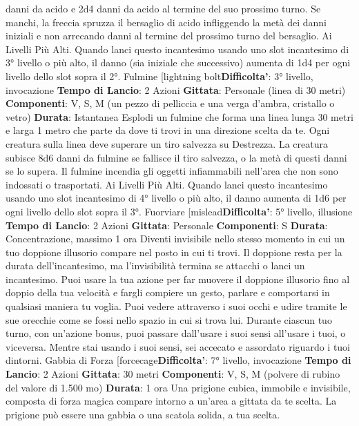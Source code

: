 \begin{multicols}{2}
danni da acido e 2d4 danni da acido al termine del suo
prossimo turno. Se manchi, la freccia spruzza il
bersaglio di acido infliggendo la metà dei danni iniziali e
non arrecando danni al termine del prossimo turno del
bersaglio.
Ai Livelli Più Alti. Quando lanci questo incantesimo
usando uno slot incantesimo di 3° livello o più alto, il
danno (sia iniziale che successivo) aumenta di 1d4 per
ogni livello dello slot sopra il 2°.
Fulmine
[lightning bolt\textbf{Difficolta'}:
3° livello, invocazione
\textbf{Tempo di Lancio}: 2 Azioni
\textbf{Gittata}: Personale (linea di 30 metri)
\textbf{Componenti}: V, S, M (un pezzo di pelliccia e una
verga d’ambra, cristallo o vetro)
\textbf{Durata}: Istantanea
Esplodi un fulmine che forma una linea lunga 30 metri e
larga 1 metro che parte da dove ti trovi in una
direzione scelta da te.
Ogni creatura sulla linea deve superare un tiro salvezza
su Destrezza. La creatura subisce 8d6 danni da fulmine
se fallisce il tiro salvezza, o la metà di questi danni se lo
supera.
Il fulmine incendia gli oggetti infiammabili nell’area che
non sono indossati o trasportati.
Ai Livelli Più Alti. Quando lanci questo incantesimo
usando uno slot incantesimo di 4° livello o più alto, il
danno aumenta di 1d6 per ogni livello dello slot sopra il
3°.
Fuorviare
[mislead\textbf{Difficolta'}:
5° livello, illusione
\textbf{Tempo di Lancio}: 2 Azioni
\textbf{Gittata}: Personale
\textbf{Componenti}: S
\textbf{Durata}: Concentrazione, massimo 1 ora
Diventi invisibile nello stesso momento in cui un tuo
doppione illusorio compare nel posto in cui ti trovi. Il
doppione resta per la durata dell’incantesimo, ma
l’invisibilità termina se attacchi o lanci un incantesimo.
Puoi usare la tua azione per far muovere il doppione
illusorio fino al doppio della tua velocità e fargli
compiere un gesto, parlare e comportarsi in qualsiasi
maniera tu voglia.
Puoi vedere attraverso i suoi occhi e udire tramite le
sue orecchie come se fossi nello spazio in cui si trova
lui. Durante ciascun tuo turno, con un’azione bonus,
puoi passare dall’usare i suoi sensi all’usare i tuoi, o
viceversa. Mentre stai usando i suoi sensi, sei accecato
e assordato riguardo i tuoi dintorni.
Gabbia di Forza
[forcecage\textbf{Difficolta'}:
7° livello, invocazione
\textbf{Tempo di Lancio}: 2 Azioni
\textbf{Gittata}: 30 metri
\textbf{Componenti}: V, S, M (polvere di rubino del valore di
1.500 mo)
\textbf{Durata}: 1 ora
Una prigione cubica, immobile e invisibile, composta di
forza magica compare intorno a un’area a gittata da te
scelta. La prigione può essere una gabbia o una scatola
solida, a tua scelta.

\end{multicols}
